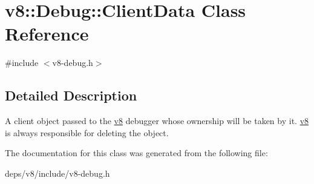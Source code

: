 \hypertarget{classv8_1_1_debug_1_1_client_data}{}\section{v8\+:\+:Debug\+:\+:Client\+Data Class Reference}
\label{classv8_1_1_debug_1_1_client_data}


{\ttfamily \#include $<$v8-\/debug.\+h$>$}



\subsection{Detailed Description}
A client object passed to the \hyperlink{namespacev8}{v8} debugger whose ownership will be taken by it. \hyperlink{namespacev8}{v8} is always responsible for deleting the object. 

The documentation for this class was generated from the following file\+:\begin{DoxyCompactItemize}
\item 
deps/v8/include/v8-\/debug.\+h\end{DoxyCompactItemize}
